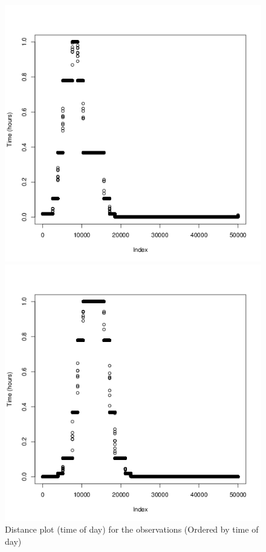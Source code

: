 \documentclass[a4paper, twocolumn]{article}
\begin{document}
    \begin{figure}[H]
    \centering
    \caption{Distance plot (time of day) for the observations (Ordered by time of day) \label{fig:time}}
	    \begin{minipage}[]{0.2\textwidth}
	    	\includegraphics[width=\textwidth]{share/1_time.png}
	    \end{minipage}
	    \begin{minipage}[]{0.2\textwidth}
	    	\includegraphics[width=\textwidth]{share/2_time.png}

\end{minipage}
\end{figure}
\end{document}
